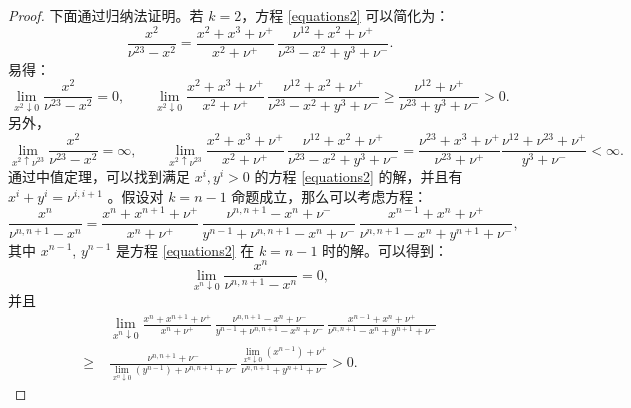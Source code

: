 \begin{proof}
    下面通过归纳法证明。若 $k=2$，方程 \eqref{equations2} 可以简化为：
    \begin{equation*}\label{equation k=2}
        \frac{x^{2}}{\nu^{23}-x^2}
        =\frac{x^{2}+x^{3}+\nu^+}{x^{2}+\nu^+}\, \frac{\nu^{12}+x^{2}+\nu^{+}}{\nu^{23}-x^2+y^3+\nu^-}.
    \end{equation*}
    易得：
    \begin{equation*}
        \lim_{x^{2}\downarrow 0}\frac{x^{2}}{\nu^{23}-x^2} = 0,\qquad \lim_{x^{2}\downarrow 0}\frac{x^{2}+x^{3}+\nu^+}{x^{2}+\nu^+}\, \frac{\nu^{12}+x^{2}+\nu^{+}}{\nu^{23}-x^2+y^3+\nu^-} \ge  \frac{\nu^{12}+\nu^{+}}{\nu^{23}+y^{3}+\nu^-} > 0.
    \end{equation*} 
    另外，
    \begin{equation*}
        \lim_{x^2\uparrow \nu^{23}}\frac{x^{2}}{\nu^{23}-x^2} = \infty,\qquad \lim_{x^{2}\uparrow \nu^{23}}\frac{x^{2}+x^{3}+\nu^+}{x^{2}+\nu^+}\, \frac{\nu^{12}+x^{2}+\nu^{+}}{\nu^{23}-x^2+y^3+\nu^-} =  \frac{\nu^{23}+x^{3}+\nu^+}{\nu^{23}+\nu^+}\frac{\nu^{12}+\nu^{23}+\nu^{+}}{y^{3}+\nu^-} < \infty.
    \end{equation*}
    通过中值定理，可以找到满足 $x^{i},y^i>0$ 的方程 \eqref{equations2} 的解，并且有 $x^{i}+y^{i}=\nu^{i,i+1}$ 。假设对 $k=n-1$ 命题成立，那么可以考虑方程：
    \begin{equation*}
        \frac{x^{n}}{\nu^{n,n+1}-x^{n}} = \frac{x^{n}+x^{n+1}+\nu^+}{x^{n}+\nu^+}\,\frac{\nu^{n,n+1}-x^{n}+\nu^-}{y^{n-1}+\nu^{n,n+1}-x^{n}+\nu^-}\,\frac{x^{n-1}+x^{n}+\nu^+}{\nu^{n,n+1}-x^{n}+y^{n+1}+\nu^-},
    \end{equation*}
    其中 $x^{n-1}$, $y^{n-1}$ 是方程 \eqref{equations2} 在 $k=n-1$ 时的解。可以得到：
    \begin{equation}\label{limit1}
        \lim_{x^{n}\downarrow 0}\frac{x^{n}}{\nu^{n,n+1}-x^{n}}=0,
    \end{equation}
    并且
    \begin{equation}\label{limit2}
        \begin{split}
            &\;\lim_{x^{n}\downarrow 0}\frac{x^{n}+x^{n+1}+\nu^+}{x^{n}+\nu^+}\,\frac{\nu^{n,n+1}-x^{n}+\nu^-}{y^{n-1}+\nu^{n,n+1}-x^{n}+\nu^-}\,\frac{x^{n-1}+x^{n}+\nu^+}{\nu^{n,n+1}-x^{n}+y^{n+1}+\nu^-}\\
            \ge &\;\frac{\nu^{n,n+1}+\nu^-}{\lim_{x^{n}\downarrow 0}(y^{n-1})+\nu^{n,n+1}+\nu^-}\,\frac{\lim_{x^{n}\downarrow 0}(x^{n-1})+\nu^+}{\nu^{n,n+1}+y^{n+1}+\nu^-}>0.
        \end{split}

\end{equation}
\end{proof}
